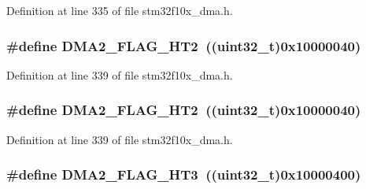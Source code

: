 Definition at line 335 of file stm32f10x\+\_\+dma.\+h.

\subsubsection[{\texorpdfstring{D\+M\+A2\+\_\+\+F\+L\+A\+G\+\_\+\+H\+T2}{DMA2_FLAG_HT2}}]{\setlength{\rightskip}{0pt plus 5cm}\#define D\+M\+A2\+\_\+\+F\+L\+A\+G\+\_\+\+H\+T2~(({\bf uint32\+\_\+t})0x10000040)}\hypertarget{group___d_m_a__flags__definition_gaa4ecfdaca0509737af68143d23d0267c}{}\label{group___d_m_a__flags__definition_gaa4ecfdaca0509737af68143d23d0267c}


Definition at line 339 of file stm32f10x\+\_\+dma.\+h.

\subsubsection[{\texorpdfstring{D\+M\+A2\+\_\+\+F\+L\+A\+G\+\_\+\+H\+T2}{DMA2_FLAG_HT2}}]{\setlength{\rightskip}{0pt plus 5cm}\#define D\+M\+A2\+\_\+\+F\+L\+A\+G\+\_\+\+H\+T2~(({\bf uint32\+\_\+t})0x10000040)}\hypertarget{group___d_m_a__flags__definition_gaa4ecfdaca0509737af68143d23d0267c}{}\label{group___d_m_a__flags__definition_gaa4ecfdaca0509737af68143d23d0267c}


Definition at line 339 of file stm32f10x\+\_\+dma.\+h.

\subsubsection[{\texorpdfstring{D\+M\+A2\+\_\+\+F\+L\+A\+G\+\_\+\+H\+T3}{DMA2_FLAG_HT3}}]{\setlength{\rightskip}{0pt plus 5cm}\#define D\+M\+A2\+\_\+\+F\+L\+A\+G\+\_\+\+H\+T3~(({\bf uint32\+\_\+t})0x10000400)}\hypertarget{group___d_m_a__flags__definition_ga1af48c549d9aa04e8161cb8b398ef39c}{}\label{group___d_m_a__flags__definition_ga1af48c549d9aa04e8161cb8b398ef39c}


